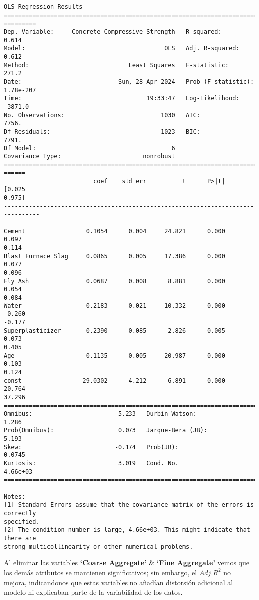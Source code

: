 \documentclass[11pt]{article}
\begin{document}
    \begin{Verbatim}[commandchars=\\\{\}]
                                  OLS Regression Results
================================================================================
=========
Dep. Variable:     Concrete Compressive Strength   R-squared:
0.614
Model:                                       OLS   Adj. R-squared:
0.612
Method:                            Least Squares   F-statistic:
271.2
Date:                           Sun, 28 Apr 2024   Prob (F-statistic):
1.78e-207
Time:                                   19:33:47   Log-Likelihood:
-3871.0
No. Observations:                           1030   AIC:
7756.
Df Residuals:                               1023   BIC:
7791.
Df Model:                                      6
Covariance Type:                       nonrobust
================================================================================
======
                         coef    std err          t      P>|t|      [0.025
0.975]
--------------------------------------------------------------------------------
------
Cement                 0.1054      0.004     24.821      0.000       0.097
0.114
Blast Furnace Slag     0.0865      0.005     17.386      0.000       0.077
0.096
Fly Ash                0.0687      0.008      8.881      0.000       0.054
0.084
Water                 -0.2183      0.021    -10.332      0.000      -0.260
-0.177
Superplasticizer       0.2390      0.085      2.826      0.005       0.073
0.405
Age                    0.1135      0.005     20.987      0.000       0.103
0.124
const                 29.0302      4.212      6.891      0.000      20.764
37.296
==============================================================================
Omnibus:                        5.233   Durbin-Watson:                   1.286
Prob(Omnibus):                  0.073   Jarque-Bera (JB):                5.193
Skew:                          -0.174   Prob(JB):                       0.0745
Kurtosis:                       3.019   Cond. No.                     4.66e+03
==============================================================================

Notes:
[1] Standard Errors assume that the covariance matrix of the errors is correctly
specified.
[2] The condition number is large, 4.66e+03. This might indicate that there are
strong multicollinearity or other numerical problems.
    \end{Verbatim}

    Al eliminar las variables \textbf{`Coarse Aggregate'} \& \textbf{`Fine
Aggregate'} vemos que los demás atributos se mantienen significativos;
sin embargo, el \(Adj. R^2\) no mejora, indicandonos que estas variables
no añadían distorsión adicional al modelo ni explicaban parte de la
variabilidad de los datos.
\end{document}
